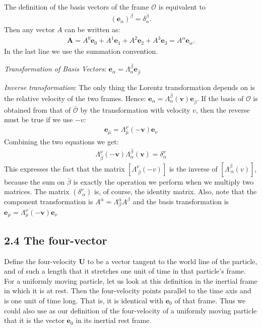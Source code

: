 \documentclass[11pt,letterpaper]{book}
\newcommand{\bm}[1]{\boldsymbol{#1}}
\begin{document}
        The definition of the basis vectors of the frame \( \mathcal{O} \) is equivalent to
        \begin{align}
        (\mathbf{e}_\alpha)^\beta = \delta_\alpha^\beta.
        \end{align}
        Then any vector \(A\) can be written as:
        \begin{align}
        \mathbf{A}= A^0 \mathbf{e}_0 + A^1 \mathbf{e}_1 + A^2 \mathbf{e}_2 + A^3 \mathbf{e}_3 = A^\alpha \mathbf{e}_\alpha.
        \end{align}
        In the last line we use the summation convention.
    
        \textit{Transformation of Basis Vectors}: \quad \( \mathbf{e}_\alpha=\Lambda^{\bar{\beta}}_\alpha \mathbf{e}_{\bar{\beta}}\)

        \textit{Inverse transformation}: The only thing the Lorentz transformation depends on is the relative velocity of the two frames. Hence: \(    \mathbf{e}_\alpha=\Lambda^{\bar{\beta}}_\alpha(\bm{v}) \mathbf{e}_{\bar{\beta}}\). If the basis of \(\mathcal{O}\) is obtained from that of \(\mathcal{\bar{O}}\) by the transformation with velocity \(v\), then the reverse must be true if we use \(-v\):
        \begin{align}
            \mathbf{e}_{\bar{\mu}}=\Lambda^{\nu}_{\bar{\mu}}(\bm{-v}) \mathbf{e}_{\nu}
        \end{align}
        Combining the two equations we get:
        \begin{align}
            \Lambda^{\nu}_{\bar{\beta}} (\bm{-v}) \Lambda^{\bar{\beta}}_{\alpha} (\bm{v}) = \delta^{\nu}_{\alpha}
        \end{align}
        This expresses the fact that the matrix \([\Lambda^\nu_{\ \bar{\beta}}(-v)]\) is the inverse of \([\Lambda^{\bar{\beta}}_{\ \alpha}(v)]\), because the sum on \(\bar{\beta}\) is exactly the operation we perform when we multiply two matrices. The matrix \((\delta^{\nu}_{\ \alpha})\) is, of course, the identity matrix. Also, note that the component transformation is \(A^{\bar{\alpha}}=\Lambda^{\bar{\alpha}}_{\beta} A^{\beta}\) and the basis transformation is \(\mathbf{e}{_{\bar{\mu}}}=\Lambda^{\nu}_{\bar{\mu}}(\bm{-v}) \mathbf{e}_{\nu}\)

    \subsection{2.4 The four-vector}

        Define the four-velocity \( \mathbf{U} \) to be a vector tangent to the world line of the particle, and of such a length that it stretches one unit of time in that particle’s frame. For a uniformly moving particle, let us look at this definition in the inertial frame in which it is at rest. Then the four-velocity points parallel to the time axis and is one unit of time long. That is, it is identical with \( \mathbf{e}_0 \) of that frame. Thus we could also use as our definition of the four-velocity of a uniformly moving particle that it is the vector \( \mathbf{e}_0 \) in its inertial rest frame.
\end{document}
